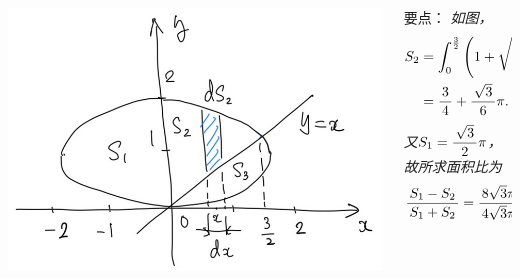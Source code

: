 \begin{frame}
	\linespread{1.5}
	\pause
	
	
	\begin{columns}
		\begin{column}{.45\textwidth}
			\begin{center}
				\includegraphics[width=.9\textwidth]{./images/ch6/ecXY.jpg}
			\end{center}		
		\end{column}
		\begin{column}{.55\textwidth}
			\small 要点：\it
			如图，
			\begin{align*}
				S_2&=\displaystyle\int_0^{\frac32}\left(1+\sqrt{1-\displaystyle\frac{\,{x^2}\,}{\,{3}\,}}-x\right)\mathrm{d} x\\
				&=\displaystyle\frac{\,{3}\,}{\,{4}\,}+\displaystyle\frac{\,{\sqrt3}\,}{\,{6}\,}\pi.
			\end{align*}
			又$S_1=\displaystyle\frac{\,{\sqrt3}\,}{\,{2}\,}\pi$，故所求面积比为
			$$\displaystyle\frac{\,{S_1-S_2}\,}{\,{S_1+S_2}\,}=\displaystyle\frac{\,{8\sqrt3\pi-9}\,}{\,{4\sqrt3\pi+9}\,}$$
		\end{column}
	\end{columns}
\end{frame}


